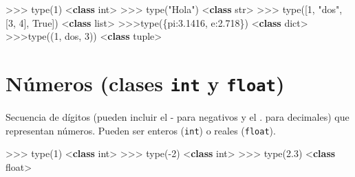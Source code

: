 \documentclass[
  spanish,
  a4paper,
]{scrreport}
\newenvironment{Shaded}{\begin{snugshade}}{\end{snugshade}}
\newcommand{\BuiltInTok}[1]{\textcolor[rgb]{0.00,0.23,0.31}{#1}}
\newcommand{\DecValTok}[1]{\textcolor[rgb]{0.68,0.00,0.00}{#1}}
\newcommand{\FloatTok}[1]{\textcolor[rgb]{0.68,0.00,0.00}{#1}}
\newcommand{\KeywordTok}[1]{\textcolor[rgb]{0.00,0.23,0.31}{\textbf{#1}}}
\newcommand{\NormalTok}[1]{\textcolor[rgb]{0.00,0.23,0.31}{#1}}
\newcommand{\OperatorTok}[1]{\textcolor[rgb]{0.37,0.37,0.37}{#1}}
\newcommand{\StringTok}[1]{\textcolor[rgb]{0.13,0.47,0.30}{#1}}
\newcommand{\VariableTok}[1]{\textcolor[rgb]{0.07,0.07,0.07}{#1}}
\begin{document}
\begin{Shaded}
\begin{Highlighting}[]
\OperatorTok{\textgreater{}\textgreater{}\textgreater{}} \BuiltInTok{type}\NormalTok{(}\DecValTok{1}\NormalTok{)}
\OperatorTok{\textless{}}\KeywordTok{class} \StringTok{\textquotesingle{}int\textquotesingle{}}\OperatorTok{\textgreater{}}
\OperatorTok{\textgreater{}\textgreater{}\textgreater{}} \BuiltInTok{type}\NormalTok{(}\StringTok{"Hola"}\NormalTok{)}
\OperatorTok{\textless{}}\KeywordTok{class} \StringTok{\textquotesingle{}str\textquotesingle{}}\OperatorTok{\textgreater{}}
\OperatorTok{\textgreater{}\textgreater{}\textgreater{}} \BuiltInTok{type}\NormalTok{([}\DecValTok{1}\NormalTok{, }\StringTok{"dos"}\NormalTok{, [}\DecValTok{3}\NormalTok{, }\DecValTok{4}\NormalTok{], }\VariableTok{True}\NormalTok{])}
\OperatorTok{\textless{}}\KeywordTok{class} \StringTok{\textquotesingle{}list\textquotesingle{}}\OperatorTok{\textgreater{}}
\OperatorTok{\textgreater{}\textgreater{}\textgreater{}}\BuiltInTok{type}\NormalTok{(\{}\StringTok{\textquotesingle{}pi\textquotesingle{}}\NormalTok{:}\FloatTok{3.1416}\NormalTok{, }\StringTok{\textquotesingle{}e\textquotesingle{}}\NormalTok{:}\FloatTok{2.718}\NormalTok{\})}
\OperatorTok{\textless{}}\KeywordTok{class} \StringTok{\textquotesingle{}dict\textquotesingle{}}\OperatorTok{\textgreater{}}
\OperatorTok{\textgreater{}\textgreater{}\textgreater{}}\BuiltInTok{type}\NormalTok{((}\DecValTok{1}\NormalTok{, }\StringTok{\textquotesingle{}dos\textquotesingle{}}\NormalTok{, }\DecValTok{3}\NormalTok{))}
\OperatorTok{\textless{}}\KeywordTok{class} \StringTok{\textquotesingle{}tuple\textquotesingle{}}\OperatorTok{\textgreater{}}
\end{Highlighting}
\end{Shaded}

\section{\texorpdfstring{Números (clases \texttt{int} y
\texttt{float})}{Números (clases int y float)}}\label{nuxfameros-clases-int-y-float}

Secuencia de dígitos (pueden incluir el - para negativos y el . para
decimales) que representan números. Pueden ser enteros (\texttt{int}) o
reales (\texttt{float}).

\begin{Shaded}
\begin{Highlighting}[]
\OperatorTok{\textgreater{}\textgreater{}\textgreater{}} \BuiltInTok{type}\NormalTok{(}\DecValTok{1}\NormalTok{)}
\OperatorTok{\textless{}}\KeywordTok{class} \StringTok{\textquotesingle{}int\textquotesingle{}}\OperatorTok{\textgreater{}}
\OperatorTok{\textgreater{}\textgreater{}\textgreater{}} \BuiltInTok{type}\NormalTok{(}\OperatorTok{{-}}\DecValTok{2}\NormalTok{)}
\OperatorTok{\textless{}}\KeywordTok{class} \StringTok{\textquotesingle{}int\textquotesingle{}}\OperatorTok{\textgreater{}}
\OperatorTok{\textgreater{}\textgreater{}\textgreater{}} \BuiltInTok{type}\NormalTok{(}\FloatTok{2.3}\NormalTok{)}
\OperatorTok{\textless{}}\KeywordTok{class} \StringTok{\textquotesingle{}float\textquotesingle{}}\OperatorTok{\textgreater{}}
\end{Highlighting}
\end{Shaded}
\end{document}
